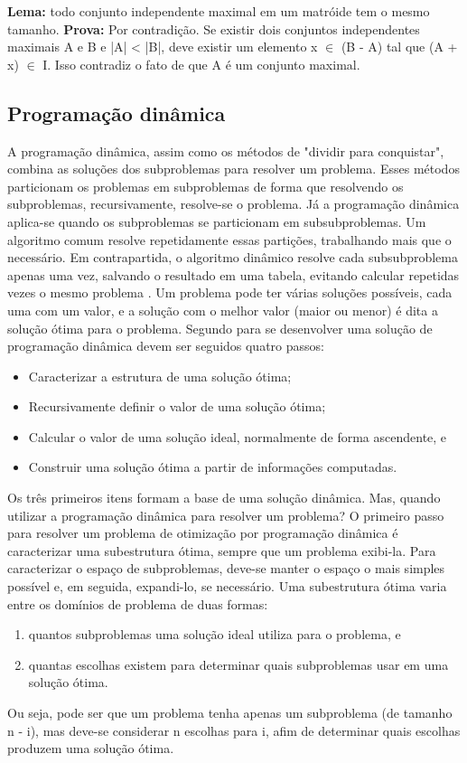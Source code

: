 \textbf{Lema:} todo conjunto independente maximal em um matróide tem o mesmo tamanho. 
\textbf{Prova:}  Por contradição. Se existir dois conjuntos independentes maximais A e B e |A| < |B|, deve existir um elemento x $\in$ (B - A) tal que (A + x) $\in$ I. Isso contradiz o fato de que A é um conjunto maximal.

\subsection{Programação dinâmica} \label{Programação dinâmica}
A programação dinâmica, assim como os métodos de "dividir para conquistar", combina as soluções dos subproblemas para resolver um problema. Esses métodos particionam os problemas em subproblemas de forma que resolvendo os subproblemas, recursivamente, resolve-se o problema. Já a programação dinâmica aplica-se quando os subproblemas se particionam em subsubproblemas. Um algoritmo comum resolve repetidamente essas partições, trabalhando mais que o necessário. Em contrapartida, o algoritmo dinâmico resolve cada subsubproblema apenas uma vez, salvando o resultado em uma tabela, evitando calcular repetidas vezes o mesmo problema \cite{cormen2009introduction}.
Um problema pode ter várias soluções possíveis, cada uma com um valor, e a solução com o melhor valor (maior ou menor) é dita a solução ótima para o problema.
Segundo \cite{cormen2009introduction} para se desenvolver uma solução de programação dinâmica devem ser seguidos quatro passos:
\begin{itemize}
\item Caracterizar a estrutura de uma solução ótima;
\item Recursivamente definir o valor de uma solução ótima;
\item Calcular o valor de uma solução ideal, normalmente de forma ascendente, e
\item Construir uma solução ótima a partir de informações computadas. 
\end{itemize}
Os três primeiros itens formam a base de uma solução dinâmica. Mas, quando utilizar a programação dinâmica para resolver um problema? O primeiro passo para resolver um problema de otimização por programação dinâmica é caracterizar uma subestrutura ótima, sempre que um problema exibi-la. 
Para caracterizar o espaço de subproblemas, deve-se manter o espaço o mais simples possível e, em seguida, expandi-lo, se necessário. Uma subestrutura ótima varia entre os domínios de problema de duas formas:
\begin{enumerate}[label=(\roman*)]
\item quantos subproblemas uma solução ideal utiliza para o problema, e
\item quantas escolhas existem para determinar quais subproblemas usar em uma solução ótima.
\end{enumerate}
Ou seja, pode ser que um problema tenha apenas um subproblema (de tamanho n - i), mas deve-se considerar n escolhas para i, afim de determinar quais escolhas produzem uma solução ótima.

